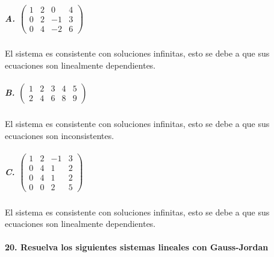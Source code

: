 \documentclass[
]{article}
\begin{document}
\hypertarget{a.-leftbeginarrayrrrr120402-1304-26endarrayright}{%
\subparagraph{\texorpdfstring{A.
\(\left(\begin{array}{rrr|r}1&2&0&4\\0&2&-1&3\\0&4&-2&6\end{array}\right)\)}{A. \textbackslash left(\textbackslash begin\{array\}\{rrr\textbar r\}1\&2\&0\&4\textbackslash\textbackslash0\&2\&-1\&3\textbackslash\textbackslash0\&4\&-2\&6\textbackslash end\{array\}\textbackslash right)}}\label{a.-leftbeginarrayrrrr120402-1304-26endarrayright}}

El sistema es consistente con soluciones infinitas, esto se debe a que
sus ecuaciones son linealmente dependientes.

\hypertarget{b.-leftbeginarrayrrrrr1234524689endarrayright}{%
\subparagraph{\texorpdfstring{B.
\(\left(\begin{array}{rrrr|r}1&2&3&4&5\\2&4&6&8&9\end{array}\right)\)}{B. \textbackslash left(\textbackslash begin\{array\}\{rrrr\textbar r\}1\&2\&3\&4\&5\textbackslash\textbackslash2\&4\&6\&8\&9\textbackslash end\{array\}\textbackslash right)}}\label{b.-leftbeginarrayrrrrr1234524689endarrayright}}

El sistema es consistente con soluciones infinitas, esto se debe a que
sus ecuaciones son inconsistentes.

\hypertarget{c.-leftbeginarrayrrrr12-13041204120025endarrayright}{%
\subparagraph{\texorpdfstring{C.
\(\left(\begin{array}{rrr|r}1&2&-1&3\\0&4&1&2\\0&4&1&2\\0&0&2&5\end{array}\right)\)}{C. \textbackslash left(\textbackslash begin\{array\}\{rrr\textbar r\}1\&2\&-1\&3\textbackslash\textbackslash0\&4\&1\&2\textbackslash\textbackslash0\&4\&1\&2\textbackslash\textbackslash0\&0\&2\&5\textbackslash end\{array\}\textbackslash right)}}\label{c.-leftbeginarrayrrrr12-13041204120025endarrayright}}

El sistema es consistente con soluciones infinitas, esto se debe a que
sus ecuaciones son linealmente dependientes.

\hypertarget{resuelva-los-siguientes-sistemas-lineales-con-gauss-jordan}{%
\paragraph{20. Resuelva los siguientes sistemas lineales con
Gauss-Jordan}\label{resuelva-los-siguientes-sistemas-lineales-con-gauss-jordan}}
\end{document}
